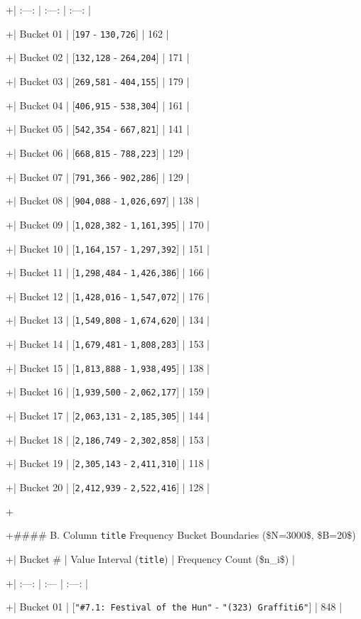 \documentclass[11pt,a4paper]{article}
\begin{document}
{+| :---: | :---: | :---: |

+| Bucket 01 | [\texttt{197} - \texttt{130,726}] | 162 |

+| Bucket 02 | [\texttt{132,128} - \texttt{264,204}] | 171 |

+| Bucket 03 | [\texttt{269,581} - \texttt{404,155}] | 179 |

+| Bucket 04 | [\texttt{406,915} - \texttt{538,304}] | 161 |

+| Bucket 05 | [\texttt{542,354} - \texttt{667,821}] | 141 |

+| Bucket 06 | [\texttt{668,815} - \texttt{788,223}] | 129 |

+| Bucket 07 | [\texttt{791,366} - \texttt{902,286}] | 129 |

+| Bucket 08 | [\texttt{904,088} - \texttt{1,026,697}] | 138 |

+| Bucket 09 | [\texttt{1,028,382} - \texttt{1,161,395}] | 170 |

+| Bucket 10 | [\texttt{1,164,157} - \texttt{1,297,392}] | 151 |

+| Bucket 11 | [\texttt{1,298,484} - \texttt{1,426,386}] | 166 |

+| Bucket 12 | [\texttt{1,428,016} - \texttt{1,547,072}] | 176 |

+| Bucket 13 | [\texttt{1,549,808} - \texttt{1,674,620}] | 134 |

+| Bucket 14 | [\texttt{1,679,481} - \texttt{1,808,283}] | 153 |

+| Bucket 15 | [\texttt{1,813,888} - \texttt{1,938,495}] | 138 |

+| Bucket 16 | [\texttt{1,939,500} - \texttt{2,062,177}] | 159 |

+| Bucket 17 | [\texttt{2,063,131} - \texttt{2,185,305}] | 144 |

+| Bucket 18 | [\texttt{2,186,749} - \texttt{2,302,858}] | 153 |

+| Bucket 19 | [\texttt{2,305,143} - \texttt{2,411,310}] | 118 |

+| Bucket 20 | [\texttt{2,412,939} - \texttt{2,522,416}] | 128 |

+

+\#\#\#\# B. Column \texttt{title} Frequency Bucket Boundaries (\$N=3000\$, \$B=20\$)

+| Bucket \# | Value Interval (\texttt{title}) | Frequency Count (\$n\_i\$) |

+| :---: | :--- | :---: |

+| Bucket 01 | [\texttt{"\#7.1: Festival of the Hun"} - \texttt{"(323) Graffiti6"}] | 848 |

}
\end{document}
